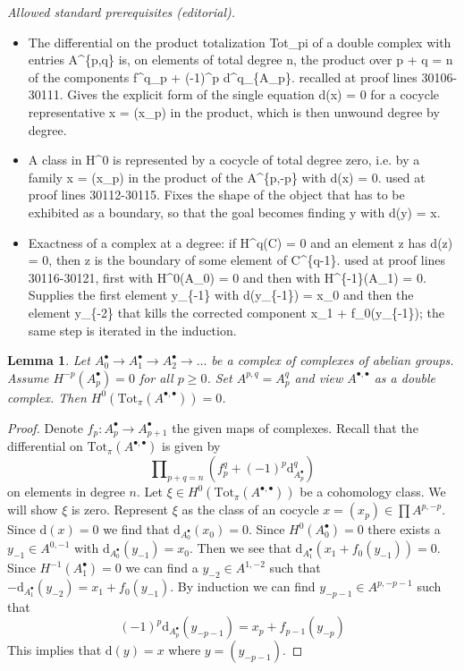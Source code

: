 \documentclass[10pt,a4paper]{amsart}
\theoremstyle{plain}
\newtheorem{lemma}[subsection]{Lemma}
\theoremstyle{definition}
\theoremstyle{remark}
\numberwithin{equation}{subsection}
\begin{document}
\noindent\textit{Allowed standard prerequisites (editorial).}\begin{itemize}
\item The differential on the product totalization Tot\_pi of a double complex with entries A\textasciicircum{}\{p,q\} is, on elements of total degree n, the product over p + q = n of the components f\textasciicircum{}q\_p + (-1)\textasciicircum{}p d\textasciicircum{}q\_\{A\_p\}. recalled at proof lines 30106-30111. Gives the explicit form of the single equation d(x) = 0 for a cocycle representative x = (x\_p) in the product, which is then unwound degree by degree.
\item A class in H\textasciicircum{}0 is represented by a cocycle of total degree zero, i.e. by a family x = (x\_p) in the product of the A\textasciicircum{}\{p,-p\} with d(x) = 0. used at proof lines 30112-30115. Fixes the shape of the object that has to be exhibited as a boundary, so that the goal becomes finding y with d(y) = x.
\item Exactness of a complex at a degree: if H\textasciicircum{}q(C) = 0 and an element z has d(z) = 0, then z is the boundary of some element of C\textasciicircum{}\{q-1\}. used at proof lines 30116-30121, first with H\textasciicircum{}0(A\_0) = 0 and then with H\textasciicircum{}\{-1\}(A\_1) = 0. Supplies the first element y\_\{-1\} with d(y\_\{-1\}) = x\_0 and then the element y\_\{-2\} that kills the corrected component x\_1 + f\_0(y\_\{-1\}); the same step is iterated in the induction.
\end{itemize}\medskip
\begin{lemma}
\label{lemma-vanishing-coh-prod-totalization}
Let $A_0^\bullet \to A_1^\bullet \to A_2^\bullet \to \ldots$
be a complex of complexes of abelian groups. Assume
$H^{-p}(A_p^\bullet) = 0$ for all $p \geq 0$.
Set $A^{p, q} = A_p^q$ and view $A^{\bullet, \bullet}$ as a double complex.
Then $H^0(\text{Tot}_\pi(A^{\bullet, \bullet})) = 0$.
\end{lemma}

\begin{proof}
Denote $f_p : A_p^\bullet \to A_{p + 1}^\bullet$ the given maps
of complexes. Recall that the differential on
$\text{Tot}_\pi(A^{\bullet, \bullet})$ is given by
$$
\prod\nolimits_{p + q = n} (f^q_p + (-1)^p\text{d}^q_{A_p^\bullet})
$$
on elements in degree $n$.
Let $\xi \in H^0(\text{Tot}_\pi(A^{\bullet, \bullet}))$ be a cohomology
class. We will show $\xi$ is zero. Represent $\xi$ as the class of an cocycle
$x = (x_p) \in \prod A^{p, -p}$.
Since $\text{d}(x) = 0$ we find that
$\text{d}_{A_0^\bullet}(x_0) = 0$.
Since $H^0(A_0^\bullet) = 0$ there exists a $y_{-1} \in A^{0, -1}$ with
$\text{d}_{A_0^\bullet}(y_{-1}) = x_0$.
Then we see that $\text{d}_{A_1^\bullet}(x_1 + f_0(y_{-1})) = 0$.
Since $H^{-1}(A_1^\bullet) = 0$ we can find a $y_{-2} \in A^{1, -2}$
such that $-\text{d}_{A_1^\bullet}(y_{-2}) = x_1 + f_0(y_{-1})$.
By induction we can find
$y_{-p - 1} \in A^{p, -p - 1}$ such that
$$
(-1)^p\text{d}_{A_p^\bullet}(y_{-p - 1}) = x_p + f_{p - 1}(y_{-p})
$$
This implies that $\text{d}(y) = x$ where $y = (y_{-p - 1})$.
\end{proof}
\end{document}
